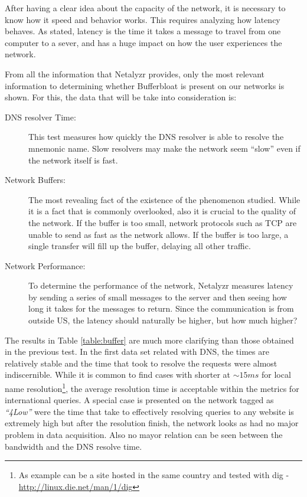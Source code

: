 After having a clear idea about the capacity of the network, it is necessary
to know how it speed and behavior works. This requires analyzing how
latency behaves. As stated, latency is the time it takes a message to travel
from one computer to a sever, and has a huge impact on how the user experiences
the network.

From all the information that Netalyzr provides, only
the most relevant information to determining whether Bufferbloat is present
on our networks is shown. For this, the data that will be take into consideration is:

\begin{description}

\item [DNS resolver Time:] This test measures how quickly the DNS
resolver is able to resolve the mnemonic name. Slow resolvers may make the
network seem ``slow'' even if the network itself is fast.

\item [Network Buffers:] The most revealing fact of the existence of the
phenomenon studied. While it is a fact that is commonly overlooked, also it is
crucial to the quality of the network. If the buffer is too small, network
protocols such as TCP are unable to send as fast as the network allows. If the
buffer is too large, a single transfer will fill up the buffer, delaying all
other traffic.

\item [Network Performance:] To determine the performance of the network,
Netalyzr measures latency by sending a series of small messages to the server
and then seeing how long it takes for the messages to return. Since the
communication is from outside US, the latency should naturally be higher, but
how much higher?
\end{description}


The results in Table \ref{table:buffer} are much more clarifying than those
obtained in the previous test. In the first data set related with DNS, the
times are relatively stable and the time that took to resolve the requests
were almost indiscernible. While it is common to find cases with shorter at
$\sim15ms$ for local name resolution\footnote{ As example can be a site hosted
in the same country and tested with dig -
\url{http://linux.die.net/man/1/dig}}, the average resolution time is
acceptable within the metrics for international queries. A special case is
presented on the network tagged as \textit{``4Low''} were the time that take
to effectively resolving queries to any website is extremely high but after
the resolution finish, the network looks as had no major problem in data
acquisition. Also no mayor relation can be seen between the bandwidth and the
DNS resolve time.

